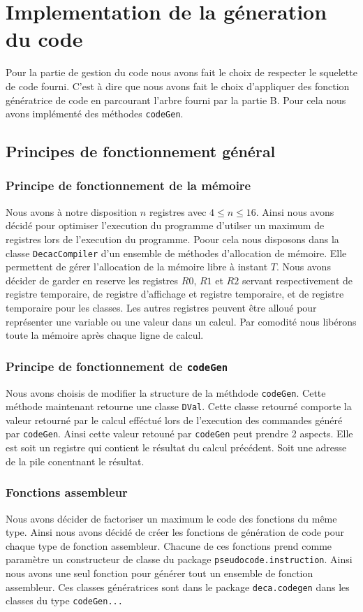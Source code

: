 \documentclass{article}
\begin{document}
\section{Implementation de la géneration du code}
Pour la partie de gestion du code nous avons fait le choix de respecter le squelette de code
fourni. C'est à dire que nous avons fait le choix d'appliquer des fonction génératrice de code en parcourant l'arbre fourni par la partie B. Pour cela nous avons implémenté des méthodes \texttt{codeGen}. 
\subsection{Principes de fonctionnement général}
\subsubsection{Principe de fonctionnement de la mémoire}
Nous avons à notre disposition $n$ registres avec $4\leq n\leq16$. Ainsi nous avons décidé pour optimiser l'execution du programme d'utilser un maximum de registres lors de l'execution du programme. Poour cela nous disposons dans la classe \texttt{DecacCompiler} d'un ensemble de méthodes d'allocation de mémoire. Elle permettent de gérer l'allocation de la mémoire libre à instant $T$. Nous avons décider de garder en reserve les registres $R0$, $R1$ et $R2$ servant respectivement de registre temporaire, de registre d'affichage et registre temporaire, et de registre temporaire pour les classes. Les autres registres peuvent être alloué pour représenter une variable ou une valeur dans un calcul. Par comodité  nous libérons toute la mémoire après chaque ligne de calcul. 
\subsubsection{Principe de fonctionnement de \texttt{codeGen}}
Nous avons choisis de modifier la structure de la méthdode \texttt{codeGen}. Cette méthode maintenant retourne une classe \texttt{DVal}. Cette classe retourné comporte la valeur retourné par le calcul efféctué lors de l'execution des commandes généré par \texttt{codeGen}. Ainsi cette valeur retouné par \texttt{codeGen} peut prendre 2 aspects. Elle est soit un registre qui contient le résultat du calcul précédent. Soit une adresse de la pile conentnant le résultat. 
\subsubsection{Fonctions assembleur}
Nous avons décider de factoriser un maximum le code des fonctions du même type. Ainsi nous avons décidé de créer les fonctions de génération de code pour chaque type de fonction assembleur. Chacune de ces fonctions prend comme paramètre un constructeur de classe du package \texttt{pseudocode.instruction}. Ainsi nous avons une seul fonction pour générer tout un ensemble de fonction assembleur. Ces classes génératrices sont dans le package \texttt{deca.codegen} dans les classes du type \texttt{codeGen...} 
\end{document}
